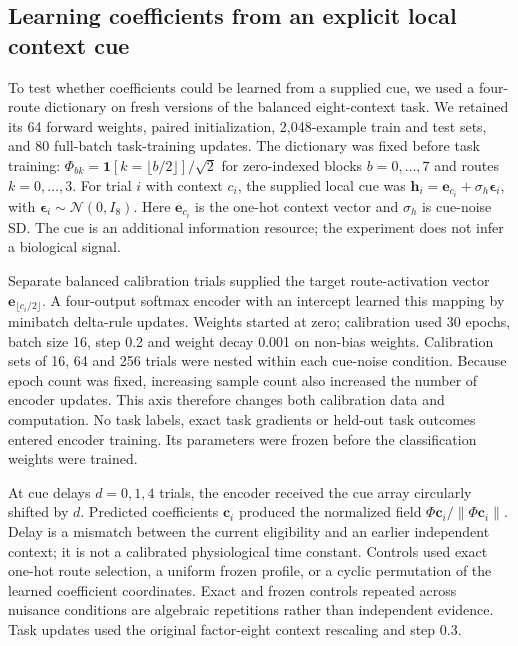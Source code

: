 \subsection{Learning coefficients from an explicit local context cue}
\label{note:local_context_encoder}

To test whether coefficients could be learned from a supplied cue, we used a
four-route dictionary on fresh versions of the balanced eight-context task.
We retained its 64 forward weights, paired initialization,
2,048-example train and test sets, and 80 full-batch task-training updates.
The dictionary was fixed before task training:
$\Phi_{bk}=\mathbf{1}[k=\lfloor b/2\rfloor]/\sqrt2$ for zero-indexed
blocks $b=0,\ldots,7$ and routes $k=0,\ldots,3$.
For trial $i$ with context $c_i$, the supplied local cue was
$\bm h_i=\bm e_{c_i}+\sigma_h\bm\epsilon_i$, with
$\bm\epsilon_i\sim\mathcal N(0,I_8)$. Here $\bm e_{c_i}$ is the one-hot
context vector and $\sigma_h$ is cue-noise SD. The cue is an additional
information resource; the experiment does not infer a biological signal.

Separate balanced calibration trials supplied the target route-activation
vector $\bm e_{\lfloor c_i/2\rfloor}$. A four-output softmax encoder with
an intercept learned this mapping by minibatch delta-rule updates. Weights
started at zero; calibration used 30 epochs, batch size 16, step 0.2 and
weight decay 0.001 on non-bias weights. Calibration sets of 16, 64 and 256
trials were nested within each cue-noise condition. Because epoch count was
fixed, increasing sample count also increased the number of encoder updates.
This axis therefore changes both calibration data and computation.
No task labels, exact task gradients or held-out task outcomes entered encoder
training. Its parameters were frozen before the classification weights were
trained.

At cue delays $d=0,1,4$ trials, the encoder received the cue array circularly
shifted by $d$. Predicted coefficients $\bm c_i$ produced the normalized
field $\Phi\bm c_i/\|\Phi\bm c_i\|$. Delay is a mismatch between the
current eligibility and an earlier independent context; it is not a calibrated
physiological time constant. Controls used exact one-hot route selection,
a uniform frozen profile, or a cyclic permutation of the learned coefficient
coordinates. Exact and frozen controls repeated across nuisance conditions
are algebraic repetitions rather than independent evidence. Task updates used
the original factor-eight context rescaling and step 0.3.

